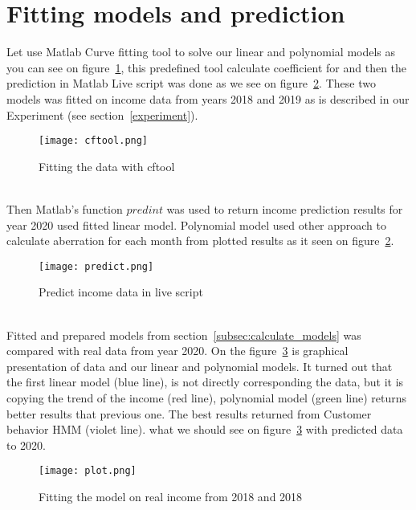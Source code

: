 \section{Fitting models and prediction} \label{fitting}
Let use Matlab Curve fitting tool to solve our linear and polynomial models as you can see on figure~\ref{cftool},
this predefined tool calculate coefficient for and then the prediction in Matlab Live script was done as we see on figure~\ref{predict}.
These two models was fitted on income data from years 2018 and 2019 as is described in our Experiment (see section~\ref{experiment}).
\begin{figure}[h!]
    \begin{center}
        \texttt{[image: cftool.png]}
    \end{center}
    \caption{Fitting the data with cftool~\cite{luarn}}
    \label{cftool}
\end{figure}\\
Then Matlab's function $predint$ was used to return income prediction results for year 2020 used fitted linear model.
Polynomial model used other approach to calculate aberration for each month from plotted results as it seen on figure~\ref{predict}.
\begin{figure}[h!]
    \begin{center}
        \texttt{[image: predict.png]}
    \end{center}
    \caption{Predict income data in live script~\cite{luarn}}
    \label{predict}
\end{figure}\\
Fitted and prepared models from section~\ref{subsec:calculate_models} was compared with real data from year 2020.
On the figure~\ref{plot} is graphical presentation of data and our linear and polynomial models.
It turned out that the first linear model (blue line), is not directly corresponding the data, but it is copying the trend of the income (red line),
polynomial model (green line) returns better results that previous one.
The best results returned from Customer behavior HMM (violet line).
what we should see on figure~\ref{plot} with predicted data to 2020.
\begin{figure}[h!]
    \begin{center}
        \texttt{[image: plot.png]}
    \end{center}
    \caption{Fitting the model on real income from 2018 and 2018}
    \label{plot}
\end{figure}\\
